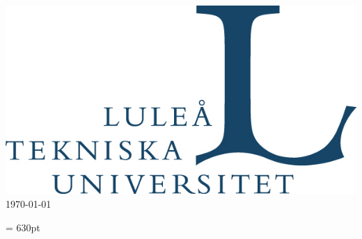 \documentclass[12pt,a4paper,english,titlepage,oneside]{article}
\begin{document}
\begin{titlepage}
\includegraphics[scale=0.20]{logo.jpg}\\[0.5cm]

{\large \today}
\vfill 

\end{titlepage}



\newpage

\pagestyle{empty}
\textheight = 630pt
\setlength\headheight{1pt} 
\end{document}
